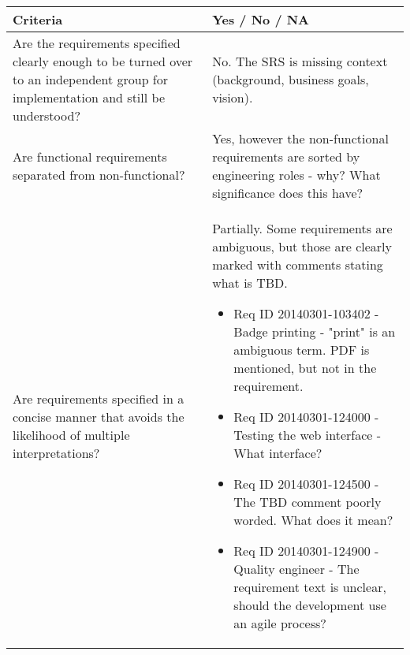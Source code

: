 \documentclass[Main]{subfiles}
\begin{document}
\begin{longtable}{p{8cm} | p{7.3cm}}
\textbf{Criteria} & \textbf{Yes / No / NA} \\ \hline

Are the requirements specified clearly enough to be turned over to an independent group for implementation and still be understood? & No. The SRS is missing context (background, business goals, vision). \\ \hline

Are functional requirements separated from non-functional? & Yes, however the non-functional requirements are sorted by engineering roles - why? What significance does this have? \\ \hline

Are requirements specified in a concise manner that avoids the likelihood of multiple interpretations? & Partially. Some requirements are ambiguous, but those are clearly marked with comments stating what is TBD.
\begin{itemize}
\item Req ID 20140301-103402 - Badge printing - "print" is an ambiguous term. PDF is mentioned, but not in the requirement.
\item Req ID 20140301-124000 - Testing the web interface - What interface?
\item Req ID 20140301-124500 - The TBD comment poorly worded. What does it mean?
\item Req ID 20140301-124900 - Quality engineer - The requirement text is unclear, should the development use an agile process? 
\end{itemize} \\ \hline


\end{longtable}
\end{document}
